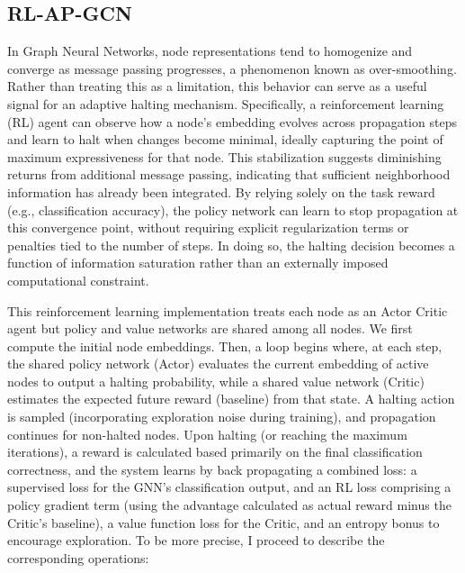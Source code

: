 \documentclass{gdl}
\begin{document}
\subsection{RL-AP-GCN}
In Graph Neural Networks, node representations tend to homogenize and converge as message passing progresses, a phenomenon known as over-smoothing. Rather than treating this as a limitation, this behavior can serve as a useful signal for an adaptive halting mechanism. Specifically, a reinforcement learning (RL) agent can observe how a node's embedding evolves across propagation steps and learn to halt when changes become minimal, ideally capturing the point of maximum expressiveness for that node. This stabilization suggests diminishing returns from additional message passing, indicating that sufficient neighborhood information has already been integrated. By relying solely on the task reward (e.g., classification accuracy), the policy network can learn to stop propagation at this convergence point, without requiring explicit regularization terms or penalties tied to the number of steps. In doing so, the halting decision becomes a function of information saturation rather than an externally imposed computational constraint.

This reinforcement learning implementation treats each node as an Actor Critic agent but policy and value networks are shared among all nodes. We first compute the initial node embeddings. Then, a loop begins where, at each step, the shared policy network (Actor) evaluates the current embedding of active nodes to output a halting probability, while a shared value network (Critic) estimates the expected future reward (baseline) from that state. A halting action is sampled (incorporating exploration noise during training), and propagation continues for non-halted nodes. Upon halting (or reaching the maximum iterations), a reward is calculated based primarily on the final classification correctness, and the system learns by back propagating a combined loss: a supervised loss for the GNN's classification output, and an RL loss comprising a policy gradient term (using the advantage calculated as actual reward minus the Critic's baseline), a value function loss for the Critic, and an entropy bonus to encourage exploration. To be more precise, I proceed to describe the corresponding operations: 
\end{document}
